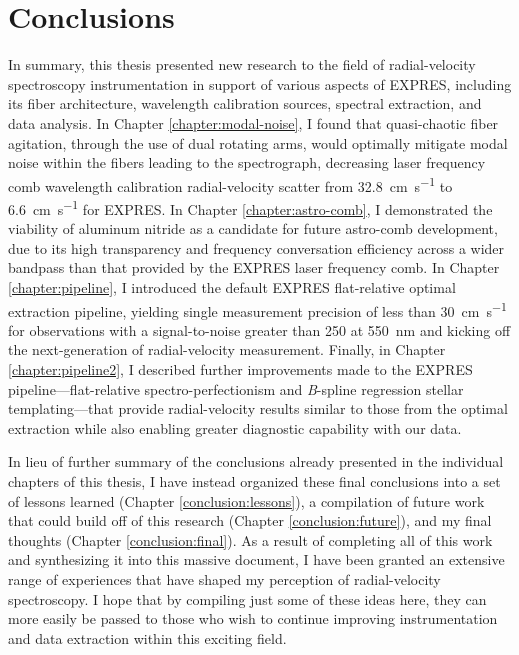 \chapter{Conclusions}\label{chapter:conclusion}

In summary, this thesis presented new research to the field of radial-velocity spectroscopy instrumentation in support of various aspects of EXPRES, including its fiber architecture, wavelength calibration sources, spectral extraction, and data analysis. In Chapter \ref{chapter:modal-noise}, I found that quasi-chaotic fiber agitation, through the use of dual rotating arms, would optimally mitigate modal noise within the fibers leading to the spectrograph, decreasing laser frequency comb wavelength calibration radial-velocity scatter from 32.8~\si{\centi\meter\per\second} to 6.6~\si{\centi\meter\per\second} for EXPRES. In Chapter \ref{chapter:astro-comb}, I demonstrated the viability of aluminum nitride as a candidate for future astro-comb development, due to its high transparency and frequency conversation efficiency across a wider bandpass than that provided by the EXPRES laser frequency comb. In Chapter \ref{chapter:pipeline}, I introduced the default EXPRES flat-relative optimal extraction pipeline, yielding single measurement precision of less than 30~\si{\centi\meter\per\second} for observations with a signal-to-noise greater than 250 at 550~\si{\nano\meter} and kicking off the next-generation of radial-velocity measurement. Finally, in Chapter \ref{chapter:pipeline2}, I described further improvements made to the EXPRES pipeline---flat-relative spectro-perfectionism and \textit{B}-spline regression stellar templating---that provide radial-velocity results similar to those from the optimal extraction while also enabling greater diagnostic capability with our data.

In lieu of further summary of the conclusions already presented in the individual chapters of this thesis, I have instead organized these final conclusions into a set of lessons learned (Chapter \ref{conclusion:lessons}), a compilation of future work that could build off of this research (Chapter \ref{conclusion:future}), and my final thoughts (Chapter \ref{conclusion:final}). As a result of completing all of this work and synthesizing it into this massive document, I have been granted an extensive range of experiences that have shaped my perception of radial-velocity spectroscopy. I hope that by compiling just some of these ideas here, they can more easily be passed to those who wish to continue improving instrumentation and data extraction within this exciting field.

